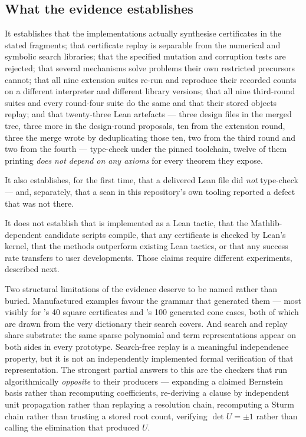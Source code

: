 \subsection{What the evidence establishes}

It establishes that the implementations actually synthesise certificates in the
stated fragments; that certificate replay is separable from the numerical and
symbolic search libraries; that the specified mutation and corruption tests are
rejected; that several mechanisms solve problems their own restricted precursors
cannot; that all nine extension suites re-run and reproduce their recorded
counts on a different interpreter and different library versions; that all
nine third-round suites and every round-four suite do the same and that their
stored objects replay; and that twenty-three Lean artefacts --- three design
files in the merged tree, three more in the design-round proposals, ten from
the extension round, three the merge wrote by deduplicating those ten, two from
the third round and two from the fourth --- type-check under the pinned
toolchain, twelve of them printing \emph{does not depend on any axioms} for
every theorem they expose.

It also establishes, for the first time, that a delivered Lean file did
\emph{not} type-check --- and, separately, that a scan in this repository's own
tooling reported a defect that was not there.

It does not establish that \forge{} is implemented as a Lean tactic, that the
Mathlib-dependent candidate scripts compile, that any certificate is checked by
Lean's kernel, that the methods outperform existing Lean tactics, or that any
success rate transfers to user developments. Those claims require different
experiments, described next.

Two structural limitations of the evidence deserve to be named rather than
buried. Manufactured examples favour the grammar that generated them --- most
visibly for 's 40 square certificates and 's 100 generated cone
cases, both of which are drawn from the very dictionary their search covers. And
search and replay share substrate: the same sparse polynomial and term
representations appear on both sides in every prototype. Search-free replay is a
meaningful independence property, but it is not an independently implemented
formal verification of that representation. The strongest partial answers to
this are the checkers that run algorithmically \emph{opposite} to their
producers --- expanding a claimed Bernstein basis rather than recomputing
coefficients, re-deriving a clause by independent unit propagation rather than
replaying a resolution chain, recomputing a Sturm chain rather than trusting a
stored root count, verifying $\det U=\pm1$ rather than calling the elimination
that produced $U$.


